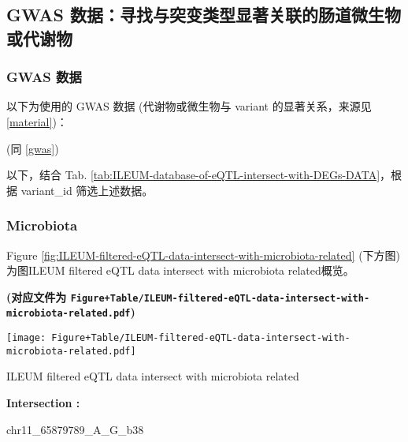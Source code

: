 \documentclass[
]{article}
\begin{document}
\hypertarget{gwas-ux6570ux636eux5bfbux627eux4e0eux7a81ux53d8ux7c7bux578bux663eux8457ux5173ux8054ux7684ux80a0ux9053ux5faeux751fux7269ux6216ux4ee3ux8c22ux7269-1}{%
\subsection{GWAS 数据：寻找与突变类型显著关联的肠道微生物或代谢物}\label{gwas-ux6570ux636eux5bfbux627eux4e0eux7a81ux53d8ux7c7bux578bux663eux8457ux5173ux8054ux7684ux80a0ux9053ux5faeux751fux7269ux6216ux4ee3ux8c22ux7269-1}}

\hypertarget{gwas-ux6570ux636e}{%
\subsubsection{GWAS 数据}\label{gwas-ux6570ux636e}}

以下为使用的 GWAS 数据 (代谢物或微生物与 variant 的显著关系，来源见 \ref{material})：

(同 \ref{gwas})

以下，结合 Tab. \ref{tab:ILEUM-database-of-eQTL-intersect-with-DEGs-DATA}，根据 variant\_id 筛选上述数据。

\hypertarget{f-mic2}{%
\subsubsection{Microbiota}\label{f-mic2}}

Figure \ref{fig:ILEUM-filtered-eQTL-data-intersect-with-microbiota-related} (下方图) 为图ILEUM filtered eQTL data intersect with microbiota related概览。

\textbf{(对应文件为 \texttt{Figure+Table/ILEUM-filtered-eQTL-data-intersect-with-microbiota-related.pdf})}

\def\@captype{figure}
\begin{center}
\texttt{[image: Figure+Table/ILEUM-filtered-eQTL-data-intersect-with-microbiota-related.pdf]}
\caption{ILEUM filtered eQTL data intersect with microbiota related}\label{fig:ILEUM-filtered-eQTL-data-intersect-with-microbiota-related}
\end{center}
\begin{center}\begin{tcolorbox}[colback=gray!10, colframe=gray!50, width=0.9\linewidth, arc=1mm, boxrule=0.5pt]
\textbf{
Intersection
:}

\vspace{0.5em}

    chr11\_65879789\_A\_G\_b38

\vspace{2em}
\end{tcolorbox}
\end{center}
\end{document}
